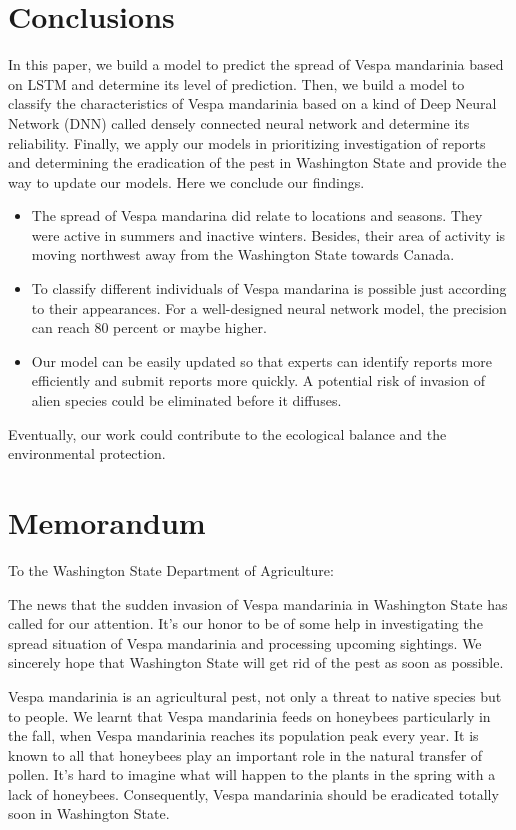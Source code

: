 \documentclass{mcmthesis}
\begin{document}
\section{Conclusions}
In this paper, we build a model to predict the spread of Vespa mandarinia based on LSTM and determine its level of prediction. Then, we build a model to classify the characteristics of Vespa mandarinia based on a kind of Deep Neural Network (DNN) called densely connected neural network and determine its reliability. Finally, we apply our models in prioritizing investigation of reports and determining the eradication of the pest in Washington State and provide the way to update our models. Here we conclude our findings.
\begin{itemize}
    \item The spread of Vespa mandarina did relate to locations and seasons. They were active in summers and inactive winters. Besides, their area of activity is moving northwest away from the Washington State towards Canada.
    \item To classify different individuals of Vespa mandarina is possible just according to their appearances. For a well-designed neural network model, the precision can reach 80 percent or maybe higher.
    \item Our model can be easily updated so that experts can identify reports more efficiently and submit reports more quickly. A potential risk of invasion of alien species could be eliminated before it diffuses.
\end{itemize}

Eventually, our work could contribute to the ecological balance and the environmental protection.
\section{Memorandum}
To the Washington State Department of Agriculture:

The news that the sudden invasion of Vespa mandarinia in Washington State has called for our attention. It’s our honor to be of some help in investigating the spread situation of Vespa mandarinia and processing upcoming sightings. We sincerely hope that Washington State will get rid of the pest as soon as possible.

Vespa mandarinia is an agricultural pest, not only a threat to native species but to people. We learnt that Vespa mandarinia feeds on honeybees particularly in the fall, when Vespa mandarinia reaches its population peak every year. It is known to all that honeybees play an important role in the natural transfer of pollen. It’s hard to imagine what will happen to the plants in the spring with a lack of honeybees. Consequently, Vespa mandarinia should be eradicated totally soon in Washington State.
\end{document}
